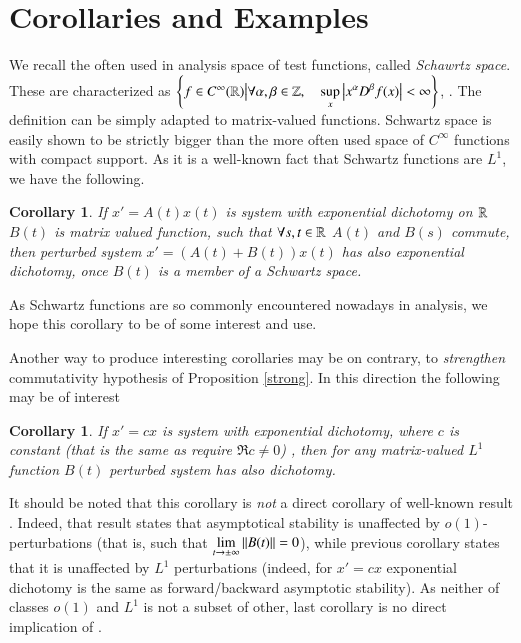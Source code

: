 \documentclass{elsarticle}
\newtheorem{corollary}[proposition]{Corollary}
\theoremstyle{remark}
\begin{document}
\section{Corollaries and Examples}
We recall the often used in analysis space of test functions, called \textit{Schawrtz space}. These are characterized
as $\mysetn{f\in C^{\infty}(\R)}{\forall \alpha,\beta\in\Z,\quad\sup_x\myabs{x^\alpha D^\beta f(x)}<\infty}$,
. The definition can be simply adapted to matrix-valued functions.
Schwartz space is easily shown to be strictly bigger than the more often used space of $C^\infty$ functions with compact support.
As it is a well-known fact that Schwartz functions are $L^1$, we have the following.
\begin{corollary}
	If $x'=A(t)x(t)$ is system with exponential dichotomy on $\mathbb{R}$ $B(t)$ is matrix valued function, such that $\forall s,t\in\mathbb{R}$
	$A(t)$ and $B(s)$ commute, then perturbed system $x'=(A(t)+B(t))x(t)$ has also exponential dichotomy, once $B(t)$ is a member
	of a Schwartz space.
\end{corollary}
As Schwartz functions are so commonly encountered nowadays in analysis, we hope this corollary to be of some interest and use.

Another way to produce interesting corollaries may be on contrary, to \textit{strengthen} commutativity hypothesis of Proposition
\ref{strong}. In this direction the following may be of interest
\begin{corollary}
	If $x'=cx$ is system with exponential dichotomy, where $c$ is constant (that is the same as require $\Re c\neq0$)
	, then for \textit{any} matrix-valued $L^1$ function $B(t)$ perturbed system has also dichotomy.
\end{corollary}
It should be noted that this corollary is \textit{not} a direct corollary of well-known result 
\cite[Corollary 3.21]{teschlordinary}. Indeed, that result states that asymptotical stability is unaffected by 
$o(1)$-perturbations (that is, such that $\lim_{t\to\pm\infty}\mynorm{B(t)}=0$), while previous corollary states that
it is unaffected by $L^1$ perturbations (indeed, for $x'=cx$ exponential dichotomy is the same as forward/backward asymptotic
stability). As neither of classes $o(1)$ and $L^1$ is not a subset of other, last corollary is no direct implication of
\cite[Corollary 3.21]{teschlordinary}.
\end{document}
